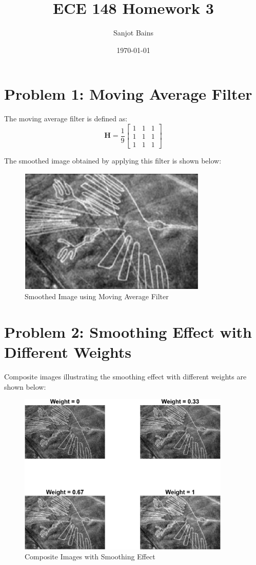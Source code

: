 \documentclass[12pt]{article}
\title{ECE 148 Homework 3}
\author{Sanjot Bains}
\date{\today}
\begin{document}
\maketitle

\section*{Problem 1: Moving Average Filter}
The moving average filter is defined as:
\[
\bm{H} = \frac{1}{9} \begin{bmatrix}
1 & 1 & 1 \\
1 & 1 & 1 \\
1 & 1 & 1
\end{bmatrix}
\]

\vspace{1cm}
The smoothed image obtained by applying this filter is shown below:

\begin{figure}[H]
    \centering
    \includegraphics[width=0.8\textwidth]{smoothed_image.png}
    \caption{Smoothed Image using Moving Average Filter}
\end{figure}

\newpage
\section*{Problem 2: Smoothing Effect with Different Weights}
Composite images illustrating the smoothing effect with different weights are shown below:

\begin{figure}[H]
    \centering
    \includegraphics[width=0.9\textwidth]{smoothed_composites.png}
    \caption{Composite Images with Smoothing Effect}
\end{figure}
\end{document}
